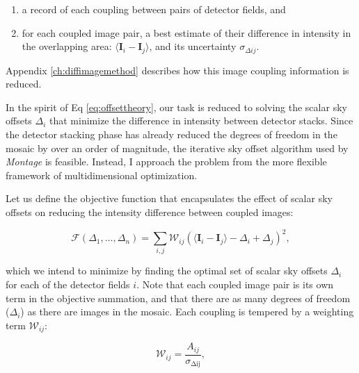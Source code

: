 \documentclass[iop]{emulateapj}
\newcommand{\vect}[1]{\boldsymbol{#1}} %
\newcommand{\sw}[1]{\textit{#1}} %
\begin{document}
\begin{enumerate}
    \item a record of each coupling between pairs of detector fields, and
    \item for each coupled image pair, a best estimate of their difference in intensity in the overlapping area: $\langle \vect{I}_i-\vect{I}_j \rangle$, and its uncertainty $\sigma_{\Delta ij}$.
\end{enumerate}

\noindent Appendix \ref{ch:diffimagemethod} describes how this image coupling information is reduced.

In the spirit of Eq \ref{eq:offsettheory}, our task is reduced to solving the scalar sky offsets $\Delta_i$ that minimize the difference in intensity between detector stacks.
Since the detector stacking phase has already reduced the degrees of freedom in the mosaic by over an order of magnitude, the iterative sky offset algorithm used by \sw{Montage} is feasible. Instead, I approach the problem from the more flexible framework of multidimensional optimization.

Let us define the objective function that encapsulates the effect of scalar sky offsets on reducing the intensity difference between coupled images:

\begin{equation}
    \mathcal{F} \left(\Delta_1,\ldots,\Delta_n \right) = \sum_{i,j} \mathcal{W}_{ij} \left( \langle \vect{I}_i - \vect{I}_j \rangle - \Delta_i + \Delta_j \right)^2,
    \label{eq:objf}
\end{equation}

\noindent which we intend to minimize by finding the optimal set of scalar sky offsets $\Delta_i$ for each of the detector fields $i$. Note that each coupled image pair is its own term in the objective summation, and that there are as many degrees of freedom ($\Delta_i$) as there are images in the mosaic. Each coupling is tempered by a weighting term $\mathcal{W}_{ij}$:

\begin{equation}
    \mathcal{W}_{ij} = \frac{A_{ij}}{\sigma_{\mathrm{\Delta ij}}},
\end{equation}
\end{document}
